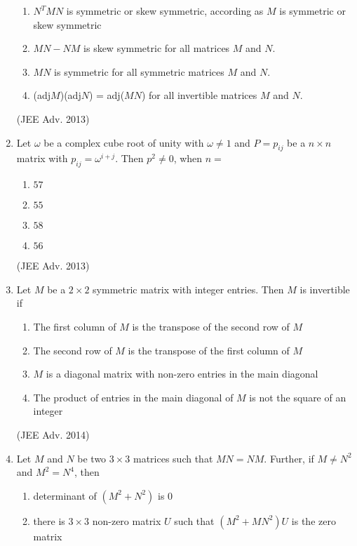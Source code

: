 \begin{enumerate}
\begin{enumerate}
                \item $N^TMN$ is symmetric or skew symmetric, according as $M$ is symmetric or skew symmetric
                \item $MN-NM$ is skew symmetric for all matrices $M$ and $N$.
                \item $MN$ is symmetric for all symmetric matrices $M$ and $N$.
                \item (adj$M$)(adj$N$) = adj($MN$) for all invertible matrices $M$ and $N$.
            \end{enumerate}
            \hfill (JEE Adv. 2013)
    \item 
        Let $\omega$ be a complex cube root of unity with $\omega \neq 1 $ and $P={p_{ij}}$ be a $n \times n$ matrix with $p_{ij} = \omega^{i+j}$. Then $p^2 \neq 0$, when $n=$
        \begin{enumerate}
            \item $57$
            \item $55$
            \item $58$
            \item $56$
        \end{enumerate}
        \hfill (JEE Adv. 2013)
    \item 
        Let $M$ be a $2 \times 2$ symmetric matrix with integer entries. Then $M$ is invertible if
            \begin{enumerate}
                \item The first column of $M$ is the transpose of the second row of $M$
                \item The second row of $M$ is the transpose of the first column of $M$
                \item $M$ is a diagonal matrix with non-zero entries in the main diagonal
                \item The product of entries in the main diagonal of $M$ is not the square of an integer
            \end{enumerate}
            \hfill (JEE Adv. 2014)
    \item
        Let $M$ and $N$ be two $3 \times 3$ matrices such that $MN=NM$. Further, if $M \neq N^2$ and $M^2 = N^4$, then
            \begin{enumerate}
                \item determinant of $(M^2 + N^2)$ is $0$
                \item there is $3 \times 3$ non-zero matrix $U$ such that $(M^2+MN^2)U$ is the zero matrix

\end{enumerate}
\end{enumerate}
